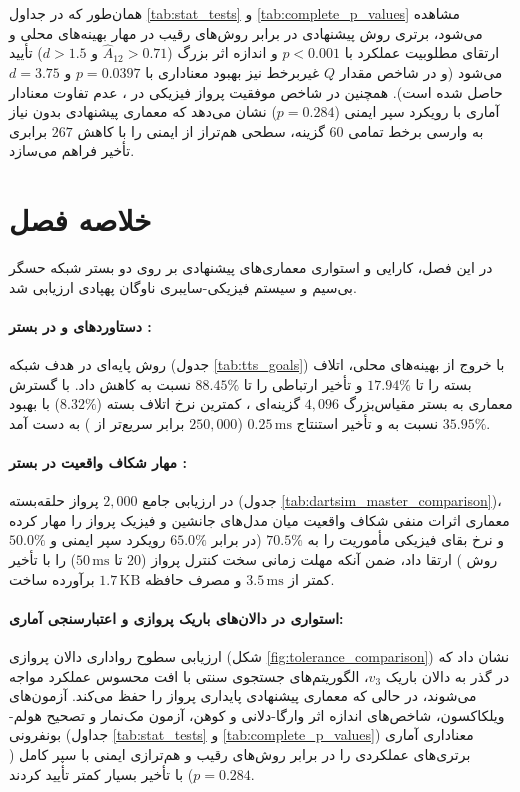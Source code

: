 \documentclass[oneside,openany,phd]{TMU-Thesis}
\begin{document}
همان‌طور که در جداول \ref{tab:stat_tests} و \ref{tab:complete_p_values} مشاهده می‌شود، برتری روش پیشنهادی در برابر روش‌های رقیب در مهار بهینه‌های محلی و ارتقای مطلوبیت عملکرد با $p < 0.001$ و اندازه اثر بزرگ ($\hat{A}_{12} > 0.71$ و $d > 1.5$) تأیید می‌شود (و در شاخص مقدار $Q$ غیربرخط نیز بهبود معناداری با $p = 0.0397$ و $d = 3.75$ حاصل شده است). همچنین در شاخص موفقیت پرواز فیزیکی در ، عدم تفاوت معنادار آماری با رویکرد سپر ایمنی ($p = 0.284$) نشان می‌دهد که معماری پیشنهادی بدون نیاز به وارسی برخط تمامی $60$ گزینه، سطحی هم‌تراز از ایمنی را با کاهش $267$ برابری تأخیر فراهم می‌سازد.

\section{خلاصه فصل}
\label{sec:ch5_summary_final}

در این فصل، کارایی و استواری معماری‌های پیشنهادی بر روی دو بستر شبکه حسگر بی‌سیم و سیستم فیزیکی-سایبری ناوگان پهپادی ارزیابی شد.

\paragraph{دستاوردهای  و \rsdrlplus در بستر :} روش پایه‌ای  در هدف  شبکه  (جدول \ref{tab:tts_goals}) با خروج از بهینه‌های محلی، اتلاف بسته را تا $17.94\%$ و تأخیر ارتباطی را تا $88.45\%$ نسبت به  کاهش داد. با گسترش معماری \rsdrlplus به بستر مقیاس‌بزرگ $4{,}096$ گزینه‌ای ، کمترین نرخ اتلاف بسته ($8.32\%$) با بهبود $35.95\%$ نسبت به  و تأخیر استنتاج $0.25\,\text{ms}$ ($250{,}000$ برابر سریع‌تر از ) به دست آمد.

\paragraph{مهار شکاف واقعیت در بستر :} در ارزیابی جامع $2{,}000$ پرواز حلقه‌بسته (جدول \ref{tab:dartsim_master_comparison})، معماری \rsdrlplus اثرات منفی شکاف واقعیت میان مدل‌های جانشین و فیزیک پرواز را مهار کرده و نرخ بقای فیزیکی مأموریت را به $\mathbf{70.5\%}$ (در برابر $65.0\%$ رویکرد سپر ایمنی و $50.0\%$ روش ) ارتقا داد، ضمن آنکه مهلت زمانی سخت کنترل پرواز ($20$ تا $50\,\text{ms}$) را با تأخیر کمتر از $3.5\,\text{ms}$ و مصرف حافظه $1.7\,\text{KB}$ برآورده ساخت.

\paragraph{استواری در دالان‌های باریک پروازی و اعتبارسنجی آماری:} ارزیابی سطوح رواداری دالان پروازی (شکل \ref{fig:tolerance_comparison}) نشان داد که در گذر به دالان باریک $v_3$، الگوریتم‌های جستجوی سنتی با افت محسوس عملکرد مواجه می‌شوند، در حالی که معماری پیشنهادی پایداری پرواز را حفظ می‌کند. آزمون‌های ویلکاکسون، شاخص‌های اندازه اثر وارگا-دلانی و کوهن، آزمون مک‌نمار و تصحیح هولم-بونفرونی (جداول \ref{tab:stat_tests} و \ref{tab:complete_p_values}) معناداری آماری برتری‌های عملکردی را در برابر روش‌های رقیب و هم‌ترازی ایمنی با سپر کامل ($p = 0.284$) با تأخیر بسیار کمتر تأیید کردند.
\newpage




\ifstandalone


\fi
\end{document}
